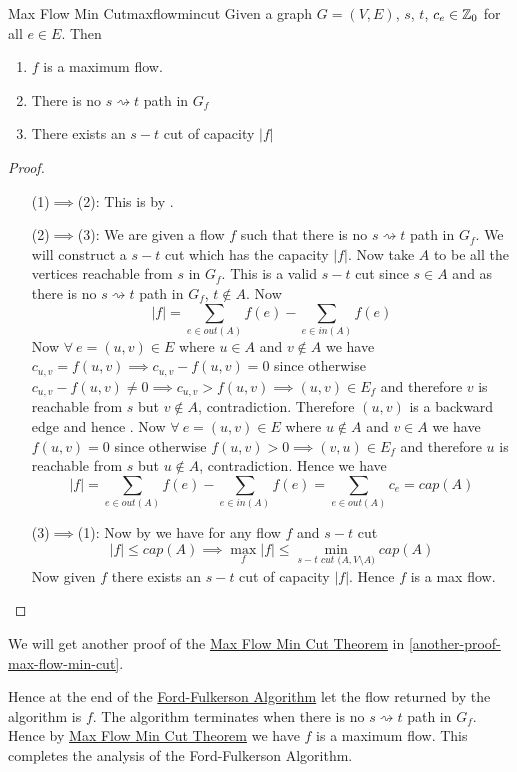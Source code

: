 \begin{Theorem}{Max Flow Min Cut}{maxflowmincut}
	Given a graph $G=(V,E)$, $s$, $t$, $c_e\in\mathbb{Z}_0$ for all $e\in E$. Then \tfae\begin{enumerate}[label=(\arabic*)]
		\item $f$ is a maximum flow.
		\item There is no $s\rightsquigarrow t$ path in $G_f$
		\item There exists an $s-t$ cut of capacity $|f|$
	\end{enumerate}
\end{Theorem}
\begin{proof}
	\begin{itemize}[leftmargin=2cm]
		\item[(1)$\implies$(2):] This is by .
		\item[(2)$\implies$(3):] We are given a flow $f$ such that there is no $s\rightsquigarrow t$ path in $G_f$. We will construct a $s-t$ cut which has the capacity $|f|$. Now take $A$ to be all the vertices reachable from $s$ in $G_f$. This is a valid $s-t$ cut since $s\in A$ and as there is no $s\rightsquigarrow t$ path in $G_f$, $t\notin A$. Now $$|f|=\sum_{e\in \textit{out$(A)$}}f(e)-\sum_{e\in\textit{in$(A)$}}f(e)$$Now $\forall\ e=(u,v)\in E$ where $u\in A$ and $v\notin A$ we have  $c_{u,v}=f(u,v)\implies c_{u,v}-f(u,v)=0$ since otherwise $c_{u,v}-f(u,v)\neq 0\implies c_{u,v}>f(u,v)\implies (u,v)\in E_f$ and therefore $v$ is reachable from $s$ but $v\notin A$, contradiction. Therefore $(u,v)$ is a backward edge and hence . Now $\forall\ e=(u,v)\in E$ where $u\notin A$ and $v\in A$ we have $f(u,v)=0$ since otherwise   $f(u,v)>0\implies (v,u)\in E_f$ and therefore $u$ is reachable from $s$ but $u\notin A$, contradiction. Hence we have $$|f|=\sum_{e\in \textit{out$(A)$}}f(e)-\sum_{e\in\textit{in$(A)$}}f(e)=\sum_{e\in \textit{out$(A)$}}c_e=\textit{cap}(A)$$
		\item[(3)$\implies$(1):] Now by  we have for any flow $f$ and $s-t$ cut $$|f|\leq \textit{cap$(A)$}\implies \max\limits_f|f|\leq\min\limits_{s-t\textit{ cut $(A,V\setminus A$)}}\textit{cap$(A)$}$$Now given $f$ there exists an $s-t$ cut of capacity $|f|$. Hence $f$ is a max flow.
	\end{itemize}
\end{proof}We will get another proof of the \hyperref[maxflowmincut]{Max Flow Min Cut Theorem} in \autoref{another-proof-max-flow-min-cut}.

Hence at the end of the \hyperref[ford-fulkerson]{Ford-Fulkerson Algorithm} let the flow returned by the algorithm is $f$. The algorithm terminates when there is no $s\rightsquigarrow t$ path in $G_f$. Hence by \hyperref[th:maxflowmincut]{Max Flow Min Cut Theorem} we have $f$ is a maximum flow. This completes the analysis of the Ford-Fulkerson Algorithm.

